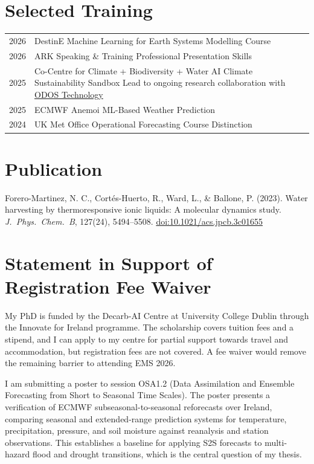 \documentclass[a4paper,11pt]{article}
\begin{document}
{\section{Selected Training}

\begin{tabularx}{\linewidth}{@{}l X@{}}
2026 & DestinE \textbar{} Machine Learning for Earth Systems Modelling Course \\
2026 & ARK Speaking \& Training \textbar{} Professional Presentation Skills \\
2025 & Co-Centre for Climate + Biodiversity + Water \textbar{} AI Climate Sustainability Sandbox \textbar{} Lead to ongoing research collaboration with \href{https://odostech.com/}{ODOS Technology} \\
2025 & ECMWF \textbar{} Anemoi ML-Based Weather Prediction \\
2024 & UK Met Office \textbar{} Operational Forecasting Course \textbar{} Distinction \\
\end{tabularx}

\section{Publication}

Forero-Martinez, N. C., Cort\'{e}s-Huerto, R., Ward, L., \& Ballone, P. (2023).
Water harvesting by thermoresponsive ionic liquids: A molecular dynamics study.
\emph{J.\ Phys.\ Chem.\ B}, 127(24), 5494--5508.
\href{https://doi.org/10.1021/acs.jpcb.3c01655}{doi:10.1021/acs.jpcb.3c01655}

\newpage
\section*{Statement in Support of Registration Fee Waiver}

My PhD is funded by the Decarb-AI Centre at University College Dublin through the Innovate for Ireland programme. The scholarship covers tuition fees and a stipend, and I can apply to my centre for partial support towards travel and accommodation, but registration fees are not covered. A fee waiver would remove the remaining barrier to attending EMS 2026.

I am submitting a poster to session OSA1.2 (Data Assimilation and Ensemble Forecasting from Short to Seasonal Time Scales). The poster presents a verification of ECMWF subseasonal-to-seasonal reforecasts over Ireland, comparing seasonal and extended-range prediction systems for temperature, precipitation, pressure, and soil moisture against reanalysis and station observations. This establishes a baseline for applying S2S forecasts to multi-hazard flood and drought transitions, which is the central question of my thesis.

}
\end{document}

